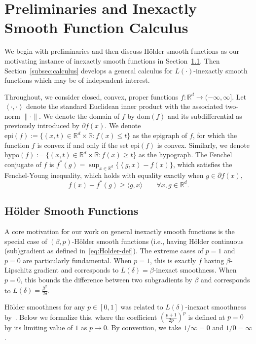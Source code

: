 \documentclass[11pt, hidelinks]{article}
\numberwithin{equation}{section}
\newcommand{\dom}[1]{\mathrm{dom }(#1)}
\newcommand{\Rext}{(-\infty, \infty]}
\theoremstyle{thmstyletwo}%
\numberwithin{equation}{section}
\newcommand{\R}{\mathbb{R}}
\newcommand{\Holder}{H\"older }
\newcommand{\inner}[2]{\left\langle {#1}, {#2} \right\rangle}
\begin{document}
\section{Preliminaries and Inexactly Smooth Function Calculus} \label{sec:inexactly smooth functions}

We begin with preliminaries and then discuss \Holder smooth functions as our motivating instance of inexactly smooth functions in Section~\ref{subsec:prelim}. Then Section~\ref{subsec:calculus} develops a general calculus for $L(\cdot)$-inexactly smooth functions which may be of independent interest.

Throughout, we consider closed, convex, proper functions $f: \R^d \to \Rext$. Let $\inner{\cdot}{\cdot}$ denote the standard Euclidean inner product with the associated two-norm $\|\cdot\|$. We denote the domain of $f$ by $\dom{f}$ and its subdifferential as previously introduced by $\partial f(x)$. We denote $\mathrm{epi}(f) := \{(x,t) \in \R^d \times \R: f(x) \leq t\}$ as the epigraph of $f$, for which the function $f$ is convex if and only if the set $\mathrm{epi}(f)$ is convex. Similarly, we denote $\mathrm{hypo}(f) :=  \{(x,t) \in \R^d \times \R: f(x) \geq t\}$ as the hypograph. The Fenchel conjugate of $f$ is $f^*(g)=\sup_{x \in \R^d} \{\inner{g}{x}-f(x)\}$, which satisfies the Fenchel-Young inequality, which holds with equality exactly when $g\in\partial f(x)$,
\begin{equation} \label{eq:Fenchel-Young}
    f(x) + f^*(g) \geq \langle g,x\rangle \qquad \forall x,g\in\mathbb{R}^d.
\end{equation}


\subsection{\Holder Smooth Functions} \label{subsec:prelim}
A core motivation for our work on general inexactly smooth functions is the special case of $(\beta,p)$-\Holder smooth functions (i.e., having \Holder continuous (sub)gradient as defined in~\eqref{eq:Holder-def}).
The extreme cases of $p=1$ and $p=0$ are particularly fundamental. When $p=1$, this is exactly $f$ having $\beta$-Lipschitz gradient and corresponds to $L(\delta)=\beta$-inexact smoothness. When $p=0$, this bounds the difference between two subgradients by $\beta$ and corresponds to $L(\delta)=\frac{\beta^2}{2\delta}$.

\Holder smoothness for any $p\in [0,1]$ was related to $L(\delta)$-inexact smoothness by~\cite{devolder_inexactly_smooth}. Below we formalize this, where the coefficient $\left(\frac{p+1}{2p}\right)^p$ is defined at $p=0$ by its limiting value of $1$ as $p\rightarrow 0$. By convention, we take $1/\infty = 0$ and $1/0 = \infty$.
\end{document}
